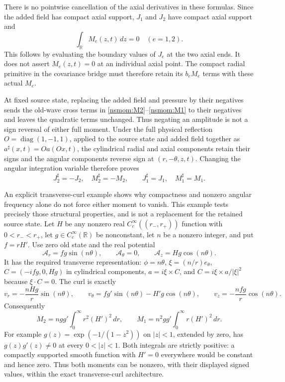 There is no pointwise cancellation of the axial derivatives in these
formulas. Since the added field has compact axial support, $J_1$ and
$J_2$ have compact axial support and
\begin{equation}
 \int_{\mathbb R}M_e(z,t)\,dz=0\quad(e=1,2).
 \label{nsmom:global_zero}
\end{equation}
This follows by evaluating the boundary values of $J_e$ at the two
axial ends. It does not assert $M_e(z,t)=0$ at an individual axial
point. The compact radial primitive in the covariance bridge must
therefore retain its $b_eM_e$ terms with these actual $M_e$.

At fixed source state, replacing the added field and pressure by their
negatives sends the old-wave cross terms in \eqref{nsmom:M2}--\eqref{nsmom:M1}
to their negatives and leaves the quadratic terms unchanged. Thus
negating an amplitude is not a sign reversal of either full moment.
Under the full physical reflection
$O=\operatorname{diag}(1,-1,1)$, applied to the source state and added
field together as $a^\sharp(x,t)=Oa(Ox,t)$, the cylindrical radial and
axial components retain their signs and the angular components reverse
sign at $(r,-\theta,z,t)$. Changing the angular integration variable
therefore proves
\[
 J_2^\sharp=-J_2,\quad M_2^\sharp=-M_2,
 \qquad J_1^\sharp=J_1,\quad M_1^\sharp=M_1.
\]

An explicit transverse-curl example shows why compactness and nonzero
angular frequency alone do not force either moment to vanish. This
example tests precisely those structural properties, and is not a
replacement for the retained source state. Let $H$ be any nonzero real
$C_c^\infty((r_-,r_+))$ function with $0<r_-<r_+$, let
$g\in C_c^\infty(\mathbb R)$ be nonconstant, let $n$ be a nonzero
integer, and put $f=rH'$. Use zero old state and the real potential
\[
 \mathcal A_r=fg\sin(n\theta),\qquad
 \mathcal A_\theta=0,\qquad
 \mathcal A_z=Hg\cos(n\theta).
\]
It has the required transverse representation:
$\phi=n\theta$, $\xi=(n/r)e_\theta$,
$C=(-ifg,0,Hg)$ in cylindrical components,
$a=i\xi\times C$, and
$C=i\xi\times a/|\xi|^2$ because $\xi\cdot C=0$.
The curl is exactly
\[
 v_r=-\frac{nHg}{r}\sin(n\theta),\qquad
 v_\theta=fg'\sin(n\theta)-H'g\cos(n\theta),\qquad
 v_z=-\frac{nfg}{r}\cos(n\theta).
\]
Consequently
\[
 M_2=ngg'\int_0^\infty r^2(H')^2\,dr,
 \qquad
 M_1=n^2gg'\int_0^\infty r(H')^2\,dr.
\]
For example $g(z)=\exp(-1/(1-z^2))$ on $|z|<1$, extended by zero,
has $g(z)g'(z)\ne0$ at every $0<|z|<1$. Both integrals are strictly
positive: a compactly supported smooth function with $H'=0$ everywhere
would be constant and hence zero. Thus both moments can be nonzero,
with their displayed signed values, within the exact transverse-curl
architecture.

